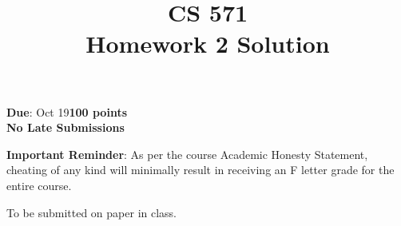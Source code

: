\documentclass[12pt]{article}
\title{CS 571\\Homework 2 Solution}
\date{}
\begin{document}
\maketitle

\begin{flushleft}
\textbf{Due}: Oct 19\hfill\textbf{100 points}\\

\textbf{No Late Submissions}

\vspace{0.5cm}

\textbf{Important Reminder}: As per the course Academic Honesty
Statement, cheating of any kind will minimally result in receiving an
F letter grade for the entire course.

\vspace{0.5cm}
To be submitted on paper in class.

\end{flushleft}
\end{document}
